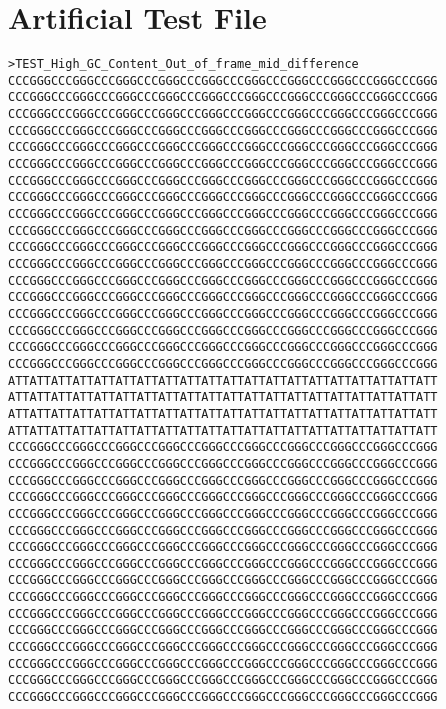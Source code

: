 \section{Artificial Test File}
\begin{verbatim}
>TEST_High_GC_Content_Out_of_frame_mid_difference
CCCGGGCCCGGGCCCGGGCCCGGGCCCGGGCCCGGGCCCGGGCCCGGGCCCGGGCCCGGG
CCCGGGCCCGGGCCCGGGCCCGGGCCCGGGCCCGGGCCCGGGCCCGGGCCCGGGCCCGGG
CCCGGGCCCGGGCCCGGGCCCGGGCCCGGGCCCGGGCCCGGGCCCGGGCCCGGGCCCGGG
CCCGGGCCCGGGCCCGGGCCCGGGCCCGGGCCCGGGCCCGGGCCCGGGCCCGGGCCCGGG
CCCGGGCCCGGGCCCGGGCCCGGGCCCGGGCCCGGGCCCGGGCCCGGGCCCGGGCCCGGG
CCCGGGCCCGGGCCCGGGCCCGGGCCCGGGCCCGGGCCCGGGCCCGGGCCCGGGCCCGGG
CCCGGGCCCGGGCCCGGGCCCGGGCCCGGGCCCGGGCCCGGGCCCGGGCCCGGGCCCGGG
CCCGGGCCCGGGCCCGGGCCCGGGCCCGGGCCCGGGCCCGGGCCCGGGCCCGGGCCCGGG
CCCGGGCCCGGGCCCGGGCCCGGGCCCGGGCCCGGGCCCGGGCCCGGGCCCGGGCCCGGG
CCCGGGCCCGGGCCCGGGCCCGGGCCCGGGCCCGGGCCCGGGCCCGGGCCCGGGCCCGGG
CCCGGGCCCGGGCCCGGGCCCGGGCCCGGGCCCGGGCCCGGGCCCGGGCCCGGGCCCGGG
CCCGGGCCCGGGCCCGGGCCCGGGCCCGGGCCCGGGCCCGGGCCCGGGCCCGGGCCCGGG
CCCGGGCCCGGGCCCGGGCCCGGGCCCGGGCCCGGGCCCGGGCCCGGGCCCGGGCCCGGG
CCCGGGCCCGGGCCCGGGCCCGGGCCCGGGCCCGGGCCCGGGCCCGGGCCCGGGCCCGGG
CCCGGGCCCGGGCCCGGGCCCGGGCCCGGGCCCGGGCCCGGGCCCGGGCCCGGGCCCGGG
CCCGGGCCCGGGCCCGGGCCCGGGCCCGGGCCCGGGCCCGGGCCCGGGCCCGGGCCCGGG
CCCGGGCCCGGGCCCGGGCCCGGGCCCGGGCCCGGGCCCGGGCCCGGGCCCGGGCCCGGG
CCCGGGCCCGGGCCCGGGCCCGGGCCCGGGCCCGGGCCCGGGCCCGGGCCCGGGCCCGGG
ATTATTATTATTATTATTATTATTATTATTATTATTATTATTATTATTATTATTATTATT
ATTATTATTATTATTATTATTATTATTATTATTATTATTATTATTATTATTATTATTATT
ATTATTATTATTATTATTATTATTATTATTATTATTATTATTATTATTATTATTATTATT
ATTATTATTATTATTATTATTATTATTATTATTATTATTATTATTATTATTATTATTATT
CCCGGGCCCGGGCCCGGGCCCGGGCCCGGGCCCGGGCCCGGGCCCGGGCCCGGGCCCGGG
CCCGGGCCCGGGCCCGGGCCCGGGCCCGGGCCCGGGCCCGGGCCCGGGCCCGGGCCCGGG
CCCGGGCCCGGGCCCGGGCCCGGGCCCGGGCCCGGGCCCGGGCCCGGGCCCGGGCCCGGG
CCCGGGCCCGGGCCCGGGCCCGGGCCCGGGCCCGGGCCCGGGCCCGGGCCCGGGCCCGGG
CCCGGGCCCGGGCCCGGGCCCGGGCCCGGGCCCGGGCCCGGGCCCGGGCCCGGGCCCGGG
CCCGGGCCCGGGCCCGGGCCCGGGCCCGGGCCCGGGCCCGGGCCCGGGCCCGGGCCCGGG
CCCGGGCCCGGGCCCGGGCCCGGGCCCGGGCCCGGGCCCGGGCCCGGGCCCGGGCCCGGG
CCCGGGCCCGGGCCCGGGCCCGGGCCCGGGCCCGGGCCCGGGCCCGGGCCCGGGCCCGGG
CCCGGGCCCGGGCCCGGGCCCGGGCCCGGGCCCGGGCCCGGGCCCGGGCCCGGGCCCGGG
CCCGGGCCCGGGCCCGGGCCCGGGCCCGGGCCCGGGCCCGGGCCCGGGCCCGGGCCCGGG
CCCGGGCCCGGGCCCGGGCCCGGGCCCGGGCCCGGGCCCGGGCCCGGGCCCGGGCCCGGG
CCCGGGCCCGGGCCCGGGCCCGGGCCCGGGCCCGGGCCCGGGCCCGGGCCCGGGCCCGGG
CCCGGGCCCGGGCCCGGGCCCGGGCCCGGGCCCGGGCCCGGGCCCGGGCCCGGGCCCGGG
CCCGGGCCCGGGCCCGGGCCCGGGCCCGGGCCCGGGCCCGGGCCCGGGCCCGGGCCCGGG
CCCGGGCCCGGGCCCGGGCCCGGGCCCGGGCCCGGGCCCGGGCCCGGGCCCGGGCCCGGG
CCCGGGCCCGGGCCCGGGCCCGGGCCCGGGCCCGGGCCCGGGCCCGGGCCCGGGCCCGGG

\end{verbatim}
